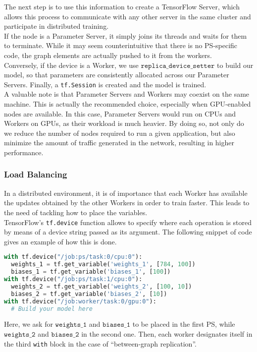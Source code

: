 The next step is to use this information to create a TensorFlow Server, which allows this process to communicate with any other server in the same cluster and participate in distributed training.\\[-0.2cm]

If the node is a Parameter Server, it simply joins its threads and waits for them to terminate. 
While it may seem counterintuitive that there is no PS-specific code, the graph elements are actually pushed to it from the workers.\\[-0.2cm]

Conversely, if the device is a Worker, we use $\texttt{replica\_device\_setter}$ to build our model, so that parameters are consistently allocated across our Parameter Servers.
Finally, a \texttt{tf.Session} is created and the model is trained.\\[-0.2cm]

A valuable note is that Parameter Servers and Workers may coexist on the same machine.
This is actually the recommended choice, especially when GPU-enabled nodes are available.
In this case, Parameter Servers would run on CPUs and Workers on GPUs, as their workload is much heavier.
By doing so, not only do we reduce the number of nodes required to run a given application, but also minimize the amount of traffic generated in the network, resulting in higher performance.

\subsubsection{Load Balancing}

In a distributed environment, it is of importance that each Worker has available the updates obtained by the other Workers in order to train faster.
This leads to the need of tackling how to place the variables.\\[-0.2cm]

TensorFlow's \texttt{tf.device} function allows to specify where each operation is stored by means of a device string passed as its argument.
The following snippet of code gives an example of how this is done.
\begin{lstlisting}[label=listing:device-string, language=Python, caption=Variable placement with device strings.]
with tf.device("/job:ps/task:0/cpu:0"):
  weights_1 = tf.get_variable('weights_1', [784, 100])
  biases_1 = tf.get_variable('biases_1', [100])
with tf.device("/job:ps/task:1/cpu:0"):
  weights_2 = tf.get_variable('weights_2', [100, 10])
  biases_2 = tf.get_variable('biases_2', [10])
with tf.device("/job:worker/task:0/gpu:0"):
  # Build your model here
\end{lstlisting}
Here, we ask for $\texttt{weights\_1}$ and $\texttt{biases\_1}$ to be placed in the first PS, while $\texttt{weights\_2}$ and $\texttt{biases\_2}$ in the second one.
Then, each worker designates itself in the third \texttt{with} block in the case of ``between-graph replication''.\\[-0.2cm]


